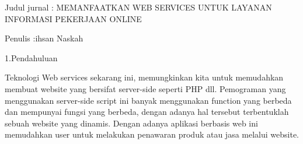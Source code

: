 \documentclass[12pt, times new roman, a4paper]{article}
\begin{document}
Judul jurnal : MEMANFAATKAN WEB SERVICES UNTUK LAYANAN INFORMASI PEKERJAAN ONLINE

Penulis :ihsan Naskah

1.Pendahuluan

Teknologi Web services sekarang ini, memungkinkan kita untuk memudahkan membuat website yang bersifat server-side seperti PHP dll.
Pemograman yang menggunakan server-side script ini banyak menggunakan function yang berbeda dan mempunyai fungsi yang berbeda, dengan adanya hal tersebut terbentuklah sebuah website yang dinamis. 
Dengan adanya aplikasi  berbasis web ini memudahkan user untuk melakukan penawaran produk atau jasa melalui website.
\end{document}
